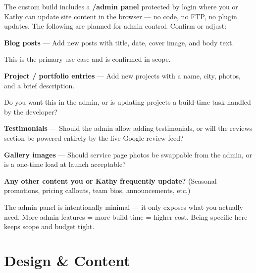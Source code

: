 \documentclass[11pt, letterpaper]{article}
\begin{document}
The custom build includes a \textbf{/admin panel} protected by login where you
or Kathy can update site content in the browser --- no code, no FTP, no plugin
updates. The following are planned for admin control. Confirm or adjust:

\begin{checklist}
  \item \textbf{Blog posts} --- Add new posts with title, date, cover image, and body text.
    \begin{checklist}
      \item This is the primary use case and is confirmed in scope.
    \end{checklist}

  \item \textbf{Project / portfolio entries} --- Add new projects with a name, city,
        photos, and a brief description.
    \begin{checklist}
      \item Do you want this in the admin, or is updating projects a
            build-time task handled by the developer?
    \end{checklist}

  \item \textbf{Testimonials} --- Should the admin allow adding testimonials,
        or will the reviews section be powered entirely by the live Google review feed?

  \item \textbf{Gallery images} --- Should service page photos be swappable from
        the admin, or is a one-time load at launch acceptable?

  \item \textbf{Any other content you or Kathy frequently update?}
    (Seasonal promotions, pricing callouts, team bios, announcements, etc.)
\end{checklist}

\begin{notebox}
\small The admin panel is intentionally minimal --- it only exposes what you
actually need. More admin features = more build time = higher cost. Being
specific here keeps scope and budget tight.
\end{notebox}

\section{Design \& Content}
\end{document}
